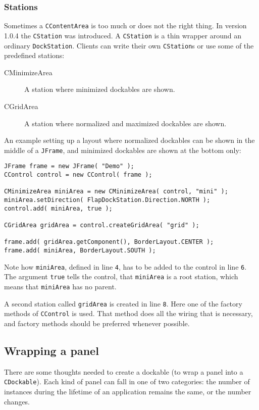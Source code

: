 \documentclass[a4paper,10pt]{article}
\newcommand{\src}[1]{\lstinline[basicstyle=\ttfamily]|#1|}
\begin{document}
\subsubsection{Stations}
Sometimes a \src{CContentArea} is too much or does not the right thing. In version 1.0.4 the \src{CStation} was introduced. A \src{CStation} is a thin wrapper around an ordinary \src{DockStation}. Clients can write their own \src{CStation}s or use some of the predefined stations:
\begin{description}
 \item[CMinimizeArea] A station where minimized dockables are shown.
 \item[CGridArea] A station where normalized and maximized dockables are shown.
 \end{description}

An example setting up a layout where normalized dockables can be shown in the middle of a \src{JFrame}, and minimized dockables are shown at the bottom only:
\begin{lstlisting}
JFrame frame = new JFrame( "Demo" );
CControl control = new CControl( frame );

CMinimizeArea miniArea = new CMinimizeArea( control, "mini" );
miniArea.setDirection( FlapDockStation.Direction.NORTH );
control.add( miniArea, true );

CGridArea gridArea = control.createGridArea( "grid" );

frame.add( gridArea.getComponent(), BorderLayout.CENTER );
frame.add( miniArea, BorderLayout.SOUTH );
\end{lstlisting}
Note how \src{miniArea}, defined in line \src{4}, has to be added to the control in line \src{6}. The argument \src{true} tells the control, that \src{miniArea} is a root station, which means that \src{miniArea} has no parent.

A second station called \src{gridArea} is created in line \src{8}. Here one of the factory methods of \src{CControl} is used. That method does all the wiring that is necessary, and factory methods should be preferred whenever possible.

\subsection{Wrapping a panel}
There are some thoughts needed to create a dockable (to wrap a panel into a \src{CDockable}). Each kind of panel can fall in one of two categories: the number of instances during the lifetime of an application remains the same, or the number changes.
\end{document}

